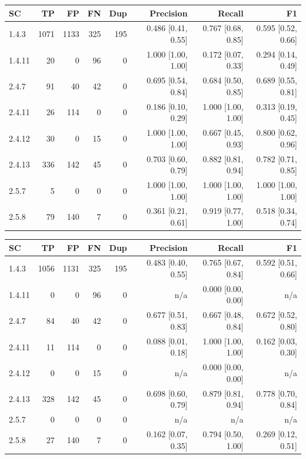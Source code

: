 \begin{tabular}{lrrrrrrr}
\hline
SC & TP & FP & FN & Dup & Precision & Recall & F1 \\
\hline
1.4.3 & 1071 & 1133 & 325 & 195 & 0.486 [0.41, 0.55] & 0.767 [0.68, 0.85] & 0.595 [0.52, 0.66] \\
1.4.11 & 20 & 0 & 96 & 0 & 1.000 [1.00, 1.00] & 0.172 [0.07, 0.33] & 0.294 [0.14, 0.49] \\
2.4.7 & 91 & 40 & 42 & 0 & 0.695 [0.54, 0.84] & 0.684 [0.50, 0.85] & 0.689 [0.55, 0.81] \\
2.4.11 & 26 & 114 & 0 & 0 & 0.186 [0.10, 0.29] & 1.000 [1.00, 1.00] & 0.313 [0.19, 0.45] \\
2.4.12 & 30 & 0 & 15 & 0 & 1.000 [1.00, 1.00] & 0.667 [0.45, 0.93] & 0.800 [0.62, 0.96] \\
2.4.13 & 336 & 142 & 45 & 0 & 0.703 [0.60, 0.79] & 0.882 [0.81, 0.94] & 0.782 [0.71, 0.85] \\
2.5.7 & 5 & 0 & 0 & 0 & 1.000 [1.00, 1.00] & 1.000 [1.00, 1.00] & 1.000 [1.00, 1.00] \\
2.5.8 & 79 & 140 & 7 & 0 & 0.361 [0.21, 0.61] & 0.919 [0.77, 1.00] & 0.518 [0.34, 0.74] \\
\hline
\end{tabular}

\begin{tabular}{lrrrrrrr}
\hline
SC & TP & FP & FN & Dup & Precision & Recall & F1 \\
\hline
1.4.3 & 1056 & 1131 & 325 & 195 & 0.483 [0.40, 0.55] & 0.765 [0.67, 0.84] & 0.592 [0.51, 0.66] \\
1.4.11 & 0 & 0 & 96 & 0 & n/a & 0.000 [0.00, 0.00] & n/a \\
2.4.7 & 84 & 40 & 42 & 0 & 0.677 [0.51, 0.83] & 0.667 [0.48, 0.84] & 0.672 [0.52, 0.80] \\
2.4.11 & 11 & 114 & 0 & 0 & 0.088 [0.01, 0.18] & 1.000 [1.00, 1.00] & 0.162 [0.03, 0.30] \\
2.4.12 & 0 & 0 & 15 & 0 & n/a & 0.000 [0.00, 0.00] & n/a \\
2.4.13 & 328 & 142 & 45 & 0 & 0.698 [0.60, 0.79] & 0.879 [0.81, 0.94] & 0.778 [0.70, 0.84] \\
2.5.7 & 0 & 0 & 0 & 0 & n/a & n/a & n/a \\
2.5.8 & 27 & 140 & 7 & 0 & 0.162 [0.07, 0.35] & 0.794 [0.50, 1.00] & 0.269 [0.12, 0.51] \\
\hline
\end{tabular}

